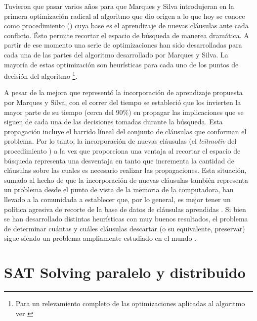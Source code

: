 Tuvieron que pasar varios años para que Marques y Silva introdujeran en
\cite{marques-silva:iccad96} la primera optimización radical al algoritmo \dpll
que dio origen a lo que hoy se conoce como procedimiento \cdcl (\CDCL) cuya base
es el aprendizaje de nuevas cláusulas ante cada conflicto. Ésto permite recortar el
espacio de búsqueda de manerea dramática. A partir de ese momento una serie de
optimizaciones han sido desarrolladas para cada una de las partes del algoritmo
desarrollado por Marques y Silva. La mayoría de estas optimización
 son heurísticas para cada uno de los puntos de decisión
del algoritmo \footnote{Para un relevamiento completo de las optimizaciones
aplicadas al algoritmo \CDCL ver \cite{manthey:mathesis}}.

A pesar de la mejora que representó la incorporación de aprendizaje propuesta
por Marques y Silva, con el correr del tiempo se estableció que los \ssolvers
invierten la mayor parte de su tiempo (cerca del $90\%$) en propagar las
implicaciones que se siguen de cada una de las decisiones tomadas durante la
búsqueda. Esta propagación incluye el barrido líneal  del conjunto de cláusulas que conforman el problema. Por lo tanto,
la incorporación de nuevas cláusulas (el \emph{leitmotiv} del procedimiento
\CDCL) a la vez que proporciona una ventaja al recortar el espacio de búsqueda
representa una desventaja en tanto que incrementa la cantidad de cláusulas sobre
las cuales es necesario realizar las propagaciones. Esta situación, sumado al
hecho de que la incorporación de nuevas cláusulas también representa un problema
desde el punto de vista de la memoria de la computadora, han llevado a la
comunidada a establecer que, por lo general, es mejor tener un política agresiva
de recorte de la base de datos de cláusulas aprendidas
\cite{Audemard:2009:PLC:1661445.1661509}. Si bien se han desarrollado distintas
heurísticas con muy buenos resultados, el problema de determinar cuántas y
cuáles cláusulas descartar (o su equivalente, preservar) sigue siendo un
problema ampliamente estudiado en el mundo \sat.

\section{SAT Solving paralelo y distribuido}

